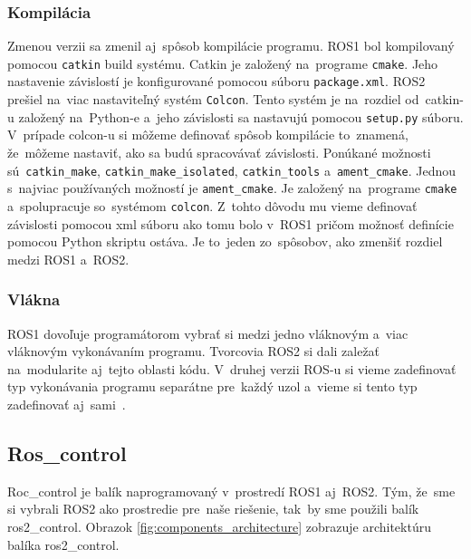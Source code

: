 \subsubsection{Kompilácia}

	Zmenou verzii sa zmenil aj~spôsob kompilácie programu. ROS1 bol kompilovaný pomocou \texttt{catkin} build systému. Catkin je založený
	na~programe \texttt{cmake}. Jeho nastavenie závislostí je konfigurované pomocou súboru \texttt{package.xml}. ROS2 prešiel na~viac
	nastaviteľný systém \texttt{Colcon}. Tento systém je na~rozdiel od~catkin-u založený na~Python-e a~jeho závislosti sa nastavujú pomocou
	\texttt{setup.py} súboru. V~prípade colcon-u si môžeme definovať spôsob kompilácie to~znamená, že~môžeme nastaviť, ako sa budú spracovávať
	závislosti. Ponúkané možnosti sú~\texttt{catkin\_make}, \texttt{catkin\_make\_isolated}, \texttt{catkin\_tools} a~\texttt{ament\_cmake}.
	Jednou s~najviac používaných možností je \texttt{ament\_cmake}. Je založený na~programe \texttt{cmake} a~spolupracuje so~systémom \texttt{colcon}.
	Z~tohto dôvodu mu vieme definovať závislosti pomocou xml súboru ako tomu bolo v~ROS1 pričom možnosť definície pomocou Python skriptu ostáva.
	Je to~jeden zo~spôsobov, ako zmenšiť rozdiel medzi ROS1 a~ROS2.

\subsubsection{Vlákna}

	ROS1 dovoľuje programátorom vybrať si medzi jedno vláknovým a~viac vláknovým vykonávaním programu. Tvorcovia ROS2 si dali zaležať na~modularite
	aj~tejto oblasti kódu. V~druhej verzii ROS-u si vieme zadefinovať typ vykonávania programu separátne pre~každý uzol a~vieme si tento typ
	zadefinovať aj~sami~\cite{ROS2design}.

\subsection{Ros\_control}
\label{subsec:roscontrol}

Roc\_control je balík naprogramovaný v~prostredí ROS1 aj~ROS2. Tým, že~sme si vybrali ROS2 ako prostredie pre~naše riešenie,
tak~by sme použili balík ros2\_control. Obrazok \ref{fig:components_architecture} zobrazuje architektúru balíka ros2\_control.

